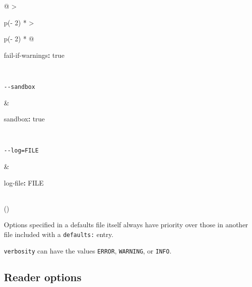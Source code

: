 \documentclass[
]{article}
\newenvironment{Shaded}{}{}
\newcommand{\AttributeTok}[1]{\textcolor[rgb]{0.49,0.56,0.16}{#1}}
\newcommand{\CharTok}[1]{\textcolor[rgb]{0.25,0.44,0.63}{#1}}
\newcommand{\FunctionTok}[1]{\textcolor[rgb]{0.02,0.16,0.49}{#1}}
\newcommand{\KeywordTok}[1]{\textcolor[rgb]{0.00,0.44,0.13}{\textbf{#1}}}
\begin{document}
\begin{longtable}[]{@{}
  >{\raggedright\arraybackslash}p{(\columnwidth - 2\tabcolsep) * }
  >{\raggedright\arraybackslash}p{(\columnwidth - 2\tabcolsep) * }@{}}
\begin{minipage}[t]{\linewidth}
\begin{Shaded}
\begin{Highlighting}[]
\FunctionTok{fail{-}if{-}warnings}\KeywordTok{:}\AttributeTok{ }\CharTok{true}
\end{Highlighting}
\end{Shaded}
\end{minipage} \\
\begin{minipage}[t]{\linewidth}\raggedright
\begin{verbatim}
--sandbox
\end{verbatim}
\end{minipage} & \begin{minipage}[t]{\linewidth}\raggedright
\begin{Shaded}
\begin{Highlighting}[]
\FunctionTok{sandbox}\KeywordTok{:}\AttributeTok{ }\CharTok{true}
\end{Highlighting}
\end{Shaded}
\end{minipage} \\
\begin{minipage}[t]{\linewidth}\raggedright
\begin{verbatim}
--log=FILE
\end{verbatim}
\end{minipage} & \begin{minipage}[t]{\linewidth}\raggedright
\begin{Shaded}
\begin{Highlighting}[]
\FunctionTok{log{-}file}\KeywordTok{:}\AttributeTok{ FILE}
\end{Highlighting}
\end{Shaded}
\end{minipage} \\
\bottomrule()
\end{longtable}

Options specified in a defaults file itself always have priority over
those in another file included with a \texttt{defaults:} entry.

\texttt{verbosity} can have the values \texttt{ERROR}, \texttt{WARNING},
or \texttt{INFO}.

\hypertarget{reader-options-1}{%
\subsection{Reader options}\label{reader-options-1}}
\end{document}
